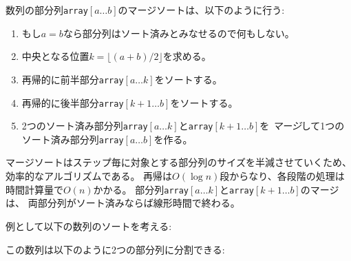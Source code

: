 数列の部分列\texttt{array}$[a \ldots b]$のマージソートは、以下のように行う:

\begin{enumerate}
\item もし$a=b$なら部分列はソート済みとみなせるので何もしない。
\item 中央となる位置$k=\lfloor (a+b)/2 \rfloor$を求める。
\item 再帰的に前半部分\texttt{array}$[a \ldots k]$をソートする。
\item 再帰的に後半部分\texttt{array}$[k+1 \ldots b]$をソートする。
\item 2つのソート済み部分列\texttt{array}$[a \ldots k]$と\texttt{array}$[k+1 \ldots b]$を
\emph{マージ}して1つのソート済み部分列\texttt{array}$[a \ldots b]$を作る。
\end{enumerate}

\begin{comment}
Merge sort is an efficient algorithm, because it
halves the size of the subarray at each step.
The recursion consists of $O(\log n)$ levels,
and processing each level takes $O(n)$ time.
Merging the subarrays \texttt{array}$[a \ldots k]$ and \texttt{array}$[k+1 \ldots b]$
is possible in linear time, because they are already sorted.

For example, consider sorting the following array:
\end{comment}

マージソートはステップ毎に対象とする部分列のサイズを半減させていくため、
効率的なアルゴリズムである。
再帰は$O(\log n)$段からなり、各段階の処理は時間計算量で$O(n)$かかる。
部分列\texttt{array}$[a \ldots k]$と\texttt{array}$[k+1 \ldots b]$のマージは、
両部分列がソート済みならば線形時間で終わる。

例として以下の数列のソートを考える:
\begin{center}
\end{center}

\begin{comment}
The array will be divided into two subarrays
as follows:
\end{comment}

この数列は以下のように2つの部分列に分割できる:
\begin{center}
\end{center}

